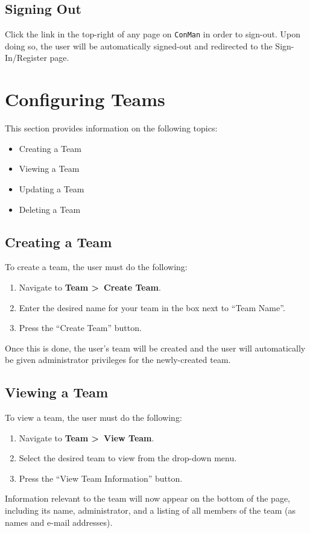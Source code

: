 \documentclass[12pt]{article}
\begin{document}
\subsection{Signing Out}
Click the link in the top-right of any page on \verb|ConMan| in order to sign-out.  Upon doing so, the user will be automatically signed-out and redirected to the Sign-In/Register page.

\newpage
\section{Configuring Teams}
This section provides information on the following topics:
\begin{itemize}
  \item Creating a Team
  \item Viewing a Team
  \item Updating a Team
  \item Deleting a Team
\end{itemize}
\subsection{Creating a Team}
To create a team, the user must do the following:
\begin{enumerate}
  \item Navigate to \textbf{Team \textgreater~Create Team}.
  \item Enter the desired name for your team in the box next to ``Team Name''.
  \item Press the ``Create Team'' button.
\end{enumerate}
Once this is done, the user's team will be created and the user will automatically be given administrator privileges for the newly-created team.
\subsection{Viewing a Team}
To view a team, the user must do the following:
\begin{enumerate}
  \item Navigate to \textbf{Team \textgreater~View Team}.
  \item Select the desired team to view from the drop-down menu.
  \item Press the ``View Team Information'' button.
\end{enumerate}
Information relevant to the team will now appear on the bottom of the page, including its name, administrator, and a listing of all members of the team (as names and e-mail addresses).
\end{document}
